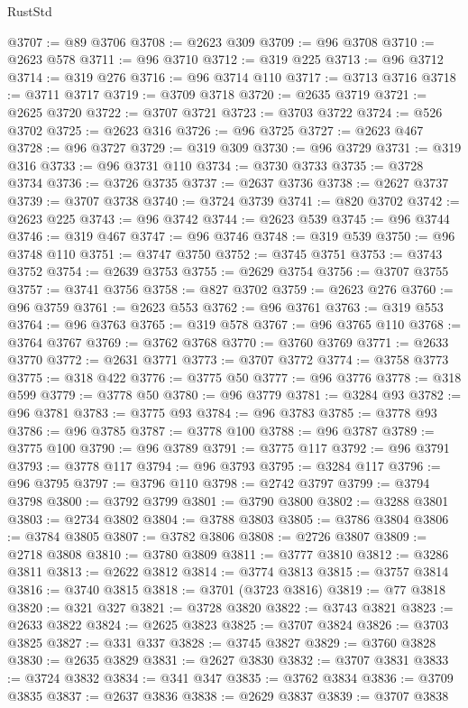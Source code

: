 \begin{lexlean}{RustStd}
\begin{coremodule}
@3707 := @89 @3706
@3708 := @2623 @309
@3709 := @96 @3708
@3710 := @2623 @578
@3711 := @96 @3710
@3712 := @319 @225
@3713 := @96 @3712
@3714 := @319 @276
@3716 := @96 @3714 @110
@3717 := @3713 @3716
@3718 := @3711 @3717
@3719 := @3709 @3718
@3720 := @2635 @3719
@3721 := @2625 @3720
@3722 := @3707 @3721
@3723 := @3703 @3722
@3724 := @526 @3702
@3725 := @2623 @316
@3726 := @96 @3725
@3727 := @2623 @467
@3728 := @96 @3727
@3729 := @319 @309
@3730 := @96 @3729
@3731 := @319 @316
@3733 := @96 @3731 @110
@3734 := @3730 @3733
@3735 := @3728 @3734
@3736 := @3726 @3735
@3737 := @2637 @3736
@3738 := @2627 @3737
@3739 := @3707 @3738
@3740 := @3724 @3739
@3741 := @820 @3702
@3742 := @2623 @225
@3743 := @96 @3742
@3744 := @2623 @539
@3745 := @96 @3744
@3746 := @319 @467
@3747 := @96 @3746
@3748 := @319 @539
@3750 := @96 @3748 @110
@3751 := @3747 @3750
@3752 := @3745 @3751
@3753 := @3743 @3752
@3754 := @2639 @3753
@3755 := @2629 @3754
@3756 := @3707 @3755
@3757 := @3741 @3756
@3758 := @827 @3702
@3759 := @2623 @276
@3760 := @96 @3759
@3761 := @2623 @553
@3762 := @96 @3761
@3763 := @319 @553
@3764 := @96 @3763
@3765 := @319 @578
@3767 := @96 @3765 @110
@3768 := @3764 @3767
@3769 := @3762 @3768
@3770 := @3760 @3769
@3771 := @2633 @3770
@3772 := @2631 @3771
@3773 := @3707 @3772
@3774 := @3758 @3773
@3775 := @318 @422
@3776 := @3775 @50
@3777 := @96 @3776
@3778 := @318 @599
@3779 := @3778 @50
@3780 := @96 @3779
@3781 := @3284 @93
@3782 := @96 @3781
@3783 := @3775 @93
@3784 := @96 @3783
@3785 := @3778 @93
@3786 := @96 @3785
@3787 := @3778 @100
@3788 := @96 @3787
@3789 := @3775 @100
@3790 := @96 @3789
@3791 := @3775 @117
@3792 := @96 @3791
@3793 := @3778 @117
@3794 := @96 @3793
@3795 := @3284 @117
@3796 := @96 @3795
@3797 := @3796 @110
@3798 := @2742 @3797
@3799 := @3794 @3798
@3800 := @3792 @3799
@3801 := @3790 @3800
@3802 := @3288 @3801
@3803 := @2734 @3802
@3804 := @3788 @3803
@3805 := @3786 @3804
@3806 := @3784 @3805
@3807 := @3782 @3806
@3808 := @2726 @3807
@3809 := @2718 @3808
@3810 := @3780 @3809
@3811 := @3777 @3810
@3812 := @3286 @3811
@3813 := @2622 @3812
@3814 := @3774 @3813
@3815 := @3757 @3814
@3816 := @3740 @3815
@3818 := @3701 (@3723 @3816)
@3819 := @77 @3818
@3820 := @321 @327
@3821 := @3728 @3820
@3822 := @3743 @3821
@3823 := @2633 @3822
@3824 := @2625 @3823
@3825 := @3707 @3824
@3826 := @3703 @3825
@3827 := @331 @337
@3828 := @3745 @3827
@3829 := @3760 @3828
@3830 := @2635 @3829
@3831 := @2627 @3830
@3832 := @3707 @3831
@3833 := @3724 @3832
@3834 := @341 @347
@3835 := @3762 @3834
@3836 := @3709 @3835
@3837 := @2637 @3836
@3838 := @2629 @3837
@3839 := @3707 @3838

\end{coremodule}
\end{lexlean}
